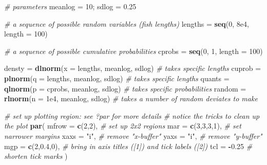 \documentclass[]{book}
\newenvironment{Shaded}{\begin{snugshade}}{\end{snugshade}}
\newcommand{\KeywordTok}[1]{\textcolor[rgb]{0.13,0.29,0.53}{\textbf{#1}}}
\newcommand{\DataTypeTok}[1]{\textcolor[rgb]{0.13,0.29,0.53}{#1}}
\newcommand{\DecValTok}[1]{\textcolor[rgb]{0.00,0.00,0.81}{#1}}
\newcommand{\FloatTok}[1]{\textcolor[rgb]{0.00,0.00,0.81}{#1}}
\newcommand{\StringTok}[1]{\textcolor[rgb]{0.31,0.60,0.02}{#1}}
\newcommand{\CommentTok}[1]{\textcolor[rgb]{0.56,0.35,0.01}{\textit{#1}}}
\newcommand{\OperatorTok}[1]{\textcolor[rgb]{0.81,0.36,0.00}{\textbf{#1}}}
\newcommand{\NormalTok}[1]{#1}
\theoremstyle{definition}
\theoremstyle{definition}
\theoremstyle{definition}
\theoremstyle{remark}
\begin{document}
\begin{Shaded}
\begin{Highlighting}[]
\CommentTok{# parameters}
\NormalTok{meanlog =}\StringTok{ }\DecValTok{10}\NormalTok{; sdlog =}\StringTok{ }\FloatTok{0.25}

\CommentTok{# a sequence of possible random variables (fish lengths)}
\NormalTok{lengths =}\StringTok{ }\KeywordTok{seq}\NormalTok{(}\DecValTok{0}\NormalTok{, }\FloatTok{8e4}\NormalTok{, }\DataTypeTok{length =} \DecValTok{100}\NormalTok{)}

\CommentTok{# a sequence of possible cumulative probabilities}
\NormalTok{cprobs =}\StringTok{ }\KeywordTok{seq}\NormalTok{(}\DecValTok{0}\NormalTok{, }\DecValTok{1}\NormalTok{, }\DataTypeTok{length =} \DecValTok{100}\NormalTok{)}

\NormalTok{densty =}\StringTok{ }\KeywordTok{dlnorm}\NormalTok{(}\DataTypeTok{x =}\NormalTok{ lengths, meanlog, sdlog)  }\CommentTok{# takes specific lengths}
\NormalTok{cuprob =}\StringTok{ }\KeywordTok{plnorm}\NormalTok{(}\DataTypeTok{q =}\NormalTok{ lengths, meanlog, sdlog)  }\CommentTok{# takes specific lengths}
\NormalTok{quants =}\StringTok{ }\KeywordTok{qlnorm}\NormalTok{(}\DataTypeTok{p =}\NormalTok{ cprobs, meanlog, sdlog)   }\CommentTok{# takes specific probabilities}
\NormalTok{random =}\StringTok{ }\KeywordTok{rlnorm}\NormalTok{(}\DataTypeTok{n =} \FloatTok{1e4}\NormalTok{, meanlog, sdlog)      }\CommentTok{# takes a number of random deviates to make}

\CommentTok{# set up plotting region: see ?par for more details}
\CommentTok{# notice the tricks to clean up the plot}
\KeywordTok{par}\NormalTok{(}
  \DataTypeTok{mfrow =} \KeywordTok{c}\NormalTok{(}\DecValTok{2}\NormalTok{,}\DecValTok{2}\NormalTok{),    }\CommentTok{# set up 2x2 regions}
  \DataTypeTok{mar =} \KeywordTok{c}\NormalTok{(}\DecValTok{3}\NormalTok{,}\DecValTok{3}\NormalTok{,}\DecValTok{3}\NormalTok{,}\DecValTok{1}\NormalTok{),  }\CommentTok{# set narrower margins}
  \DataTypeTok{xaxs =} \StringTok{"i"}\NormalTok{,        }\CommentTok{# remove "x-buffer"}
  \DataTypeTok{yaxs =} \StringTok{"i"}\NormalTok{,        }\CommentTok{# remove "y-buffer"}
  \DataTypeTok{mgp =} \KeywordTok{c}\NormalTok{(}\DecValTok{2}\NormalTok{,}\FloatTok{0.4}\NormalTok{,}\DecValTok{0}\NormalTok{),  }\CommentTok{# bring in axis titles ([1]) and tick labels ([2])}
  \DataTypeTok{tcl =} \OperatorTok{-}\FloatTok{0.25}        \CommentTok{# shorten tick marks}
\NormalTok{)}


\end{Highlighting}
\end{Shaded}
\end{document}
